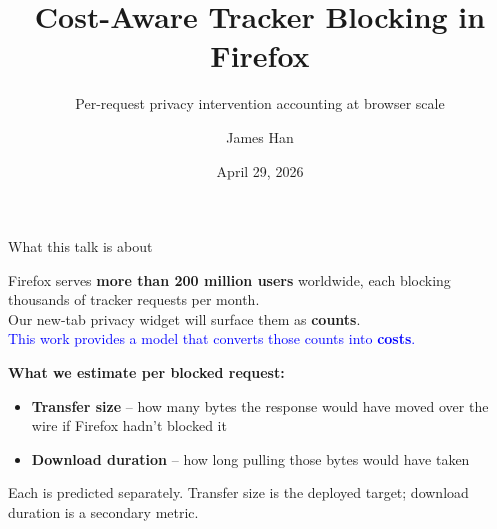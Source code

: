 \documentclass[10pt,aspectratio=169]{beamer}
\title{Cost-Aware Tracker Blocking in Firefox}
\subtitle{Per-request privacy intervention accounting at browser scale}
\author{James Han}
\institute{Privacy Team \\ Full-Stack Engineering Intern}
\date{April 29, 2026}
\begin{document}
\begin{frame}
    \titlepage
\end{frame}

\begin{frame}{What this talk is about}
    \begin{center}
    \Large
    Firefox serves \textbf{more than 200 million users} worldwide, each blocking thousands of tracker requests per month. \\[1em]
    Our new-tab privacy widget will surface them as \textbf{counts}. \\[1em]
    \textcolor{blue}{This work provides a model that converts those counts into \textbf{costs}.}
    \end{center}

    \vspace{0.6em}
    \small
    \textbf{What we estimate per blocked request:}
    \begin{itemize}
        \item \textbf{Transfer size} -- how many bytes the response would have moved over the wire if Firefox hadn't blocked it
        \item \textbf{Download duration} -- how long pulling those bytes would have taken
    \end{itemize}
    Each is predicted separately. Transfer size is the deployed target; download duration is a secondary metric.
\end{frame}
\end{document}
